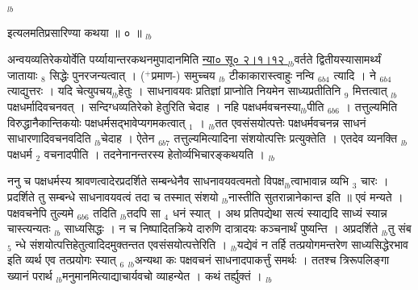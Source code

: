 \documentclass[article,12pt,a4paper]{memoir}%
\newcommand{\add}[1]{($^{+}$#1)}
\newcounter{parCount}
\begin{document}
	  
	  
	  \endgroup
	{\tiny $_{lb}$}

	  
	  \pstart \leavevmode%
	इत्यलमतिप्रसारिण्या कथया ॥ ० ॥
	{}
	\pend%
      {\tiny $_{lb}$}

	  
	  \pstart \leavevmode%
	अन्वयव्यतिरेकयोर्वेति पर्य्यायान्तरकथनमुपादानमिति \href{http://sarit.indology.info/?cref=ns\%C5\%AB.2.1.12}{न्या० सू० २।१।१२ } {\tiny $_{lb}$}वर्तते द्वितीयस्यासामर्थ्यं जातायाः {\tiny $_{8}$} सिद्धेः पुनरजन्यत्वात् । \add{प्रमाण-} समुच्चय {\tiny $_{lb}$} टीकाकारास्त्वाहुः नन्वि {\tiny $_{6b4}$} त्यादि । ने {\tiny $_{6b4}$} त्याद्युत्तरः । यदि चेत्युपचय{\tiny $_{lb}$}हेतुः । साधनावयवः प्रतिज्ञां प्राप्नोति नियमेन साध्यप्रतीतिनि {\tiny $_{9}$} \leavevmode{} मित्तत्वात् {\tiny $_{lb}$}पक्षधर्मादिवचनवत् । सन्दिग्धव्यतिरेको हेतुरिति चेदाह । {\color{DodgerBlue3}नहि पक्षधर्मवचनस्या{\tiny $_{lb}$}पीति} {\tiny $_{6b6}$} । तत्तुल्यमिति विरुद्धानैकान्तिकयोः पक्षधर्मसद्भावेप्यगमकत्वात् {\tiny $_{1}$} । {\tiny $_{lb}$}तत एवसंसयोत्पत्तेः पक्षधर्मवचनन्न साधनं साधारणादिवचनवदिति {\tiny $_{lb}$}चेदाह । {\color{DodgerBlue3}ऐतेन} {\tiny $_{6b7}$} तत्तुल्यमित्यादिना संशयोत्पत्तिः प्रत्युक्तेति । एतदेव व्यनक्ति {\tiny $_{lb}$}पक्षधर्म {\tiny $_{2}$} वचनादपीति । तदनेनानन्तरस्य हेतोर्व्यभिचारङ्कथयति ।
	{}
	\pend%
      {\tiny $_{lb}$}

	  
	  \pstart \leavevmode%
	ननु च पक्षधर्मस्य श्रावणत्वादेरप्रदर्शिते सम्बन्धेनैव साधनावयवत्वमतो विपक्ष{\tiny $_{lb}$}त्वाभावान्न व्यभि {\tiny $_{3}$} चारः । प्रदर्शिते तु सम्बन्धे साधनावयवत्वं तदा च तस्मात् संशयो {\tiny $_{lb}$}नास्तीति सुतरान्नानेकान्त इति ॥ एवं मन्यते । {\color{DodgerBlue3}पक्षवचनेपि तुल्यमे} {\tiny $_{6b6}$} तदिति {\tiny $_{lb}$}तदपि सा {\tiny $_{4}$} धनं स्यात् । अथ प्रतिपद्येथा सत्यं स्याद्यदि साध्यं स्यान्न चास्त्यन्यतः {\tiny $_{lb}$} \leavevmode{} साध्यसिद्धः । न च निष्पादितक्रिये दारुणि दात्रादयः कञ्चनार्थं पुष्यन्ति । अप्रदर्शिते {\tiny $_{lb}$}तु संब {\tiny $_{5}$} न्धे संशयोत्पत्तिहेतुत्वादिदमुक्तन्तत एवसंसयोत्पत्तेरिति । {\tiny $_{lb}$}यद्येवं न तर्हि तत्प्रयोगमन्तरेण साध्यसिद्धेरभाव इति व्यर्थ एव तत्प्रयोगः स्यात् {\tiny $_{6}$} {\tiny $_{lb}$}अन्यथा कः पक्षवचनं साधनादपाकर्त्तुं समर्थः । ततश्च {\color{DodgerBlue3}त्रिरूपलिङ्गा} ख्यानं {\color{DodgerBlue3}परार्थ} {\tiny $_{lb}$}मनुमानमित्याद्याचार्यवचो व्याहन्येत । कथं तर्ह्युक्तं ।
	{}
	\pend%
      {\tiny $_{lb}$}
\end{document}
